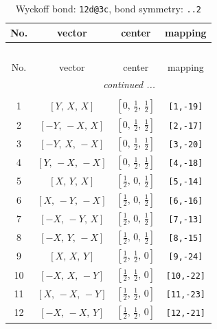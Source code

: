 \documentclass[fleqn,8pt]{jsarticle}
\begin{document}
\begin{longtable}{cccc}
\caption{Wyckoff bond: {\tt 12d@3c}, bond symmetry: {\tt ..2}}
 \\
 \hline \hline
No. & vector & center & mapping \\ \hline \endfirsthead

\multicolumn{3}{l}{\tablename\ \thetable{}} \\
 \hline \hline
No. & vector & center & mapping \\ \hline \endhead

 \hline \hline
\multicolumn{3}{r}{\footnotesize\it continued ...} \\ \endfoot

 \hline \hline
\multicolumn{3}{r}{} \\ \endlastfoot

1 & $\left[ Y,\, X,\, X \right]$ & $\left[ 0,\, \frac{1}{2},\, \frac{1}{2} \right]$ & {\tt [1,-19]} \\ \hline
2 & $\left[ - Y,\, - X,\, X \right]$ & $\left[ 0,\, \frac{1}{2},\, \frac{1}{2} \right]$ & {\tt [2,-17]} \\ \hline
3 & $\left[ - Y,\, X,\, - X \right]$ & $\left[ 0,\, \frac{1}{2},\, \frac{1}{2} \right]$ & {\tt [3,-20]} \\ \hline
4 & $\left[ Y,\, - X,\, - X \right]$ & $\left[ 0,\, \frac{1}{2},\, \frac{1}{2} \right]$ & {\tt [4,-18]} \\ \hline
5 & $\left[ X,\, Y,\, X \right]$ & $\left[ \frac{1}{2},\, 0,\, \frac{1}{2} \right]$ & {\tt [5,-14]} \\ \hline
6 & $\left[ X,\, - Y,\, - X \right]$ & $\left[ \frac{1}{2},\, 0,\, \frac{1}{2} \right]$ & {\tt [6,-16]} \\ \hline
7 & $\left[ - X,\, - Y,\, X \right]$ & $\left[ \frac{1}{2},\, 0,\, \frac{1}{2} \right]$ & {\tt [7,-13]} \\ \hline
8 & $\left[ - X,\, Y,\, - X \right]$ & $\left[ \frac{1}{2},\, 0,\, \frac{1}{2} \right]$ & {\tt [8,-15]} \\ \hline
9 & $\left[ X,\, X,\, Y \right]$ & $\left[ \frac{1}{2},\, \frac{1}{2},\, 0 \right]$ & {\tt [9,-24]} \\ \hline
10 & $\left[ - X,\, X,\, - Y \right]$ & $\left[ \frac{1}{2},\, \frac{1}{2},\, 0 \right]$ & {\tt [10,-22]} \\ \hline
11 & $\left[ X,\, - X,\, - Y \right]$ & $\left[ \frac{1}{2},\, \frac{1}{2},\, 0 \right]$ & {\tt [11,-23]} \\ \hline
12 & $\left[ - X,\, - X,\, Y \right]$ & $\left[ \frac{1}{2},\, \frac{1}{2},\, 0 \right]$ & {\tt [12,-21]} \\
\end{longtable}
\end{document}

